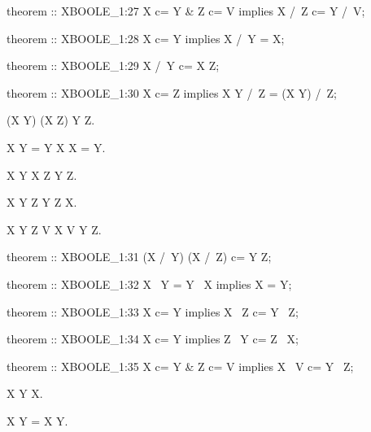 \begin{paracol}{2}
\begin{mizar}
theorem :: XBOOLE_1:27
  X c= Y & Z c= V implies 
  X /\ Z c= Y /\ V;

theorem :: XBOOLE_1:28
  X c= Y implies X /\ Y = X;

theorem :: XBOOLE_1:29
  X /\ Y c= X \/ Z;

theorem :: XBOOLE_1:30
  X c= Z implies 
  X \/ Y /\ Z = (X \/ Y) /\ Z;
\end{mizar}

\switchcolumn*\ensurevspace{5cm}

\begin{theorem}
  (X \cap Y) \cup (X \cap Z) \subset Y \cup Z.
\end{theorem}

\begin{theorem}
  X \setminus Y = Y \setminus X \implies X = Y.
\end{theorem}

\begin{theorem}
  X \subset Y \implies X \setminus Z \subset Y \setminus Z.
\end{theorem}

\begin{theorem}
  X \subset Y \implies Z \setminus Y \subset Z \setminus X.
\end{theorem}

\begin{theorem}
  X \subset Y \land Z \subset V \implies X \setminus V \subset Y \setminus Z.
\end{theorem}

\switchcolumn

\begin{mizar}
theorem :: XBOOLE_1:31
  (X /\ Y) \/ (X /\ Z) c= Y \/ Z;

theorem :: XBOOLE_1:32
  X \ Y = Y \ X implies X = Y;

theorem :: XBOOLE_1:33
  X c= Y implies X \ Z c= Y \ Z;

theorem :: XBOOLE_1:34
  X c= Y implies Z \ Y c= Z \ X;

theorem :: XBOOLE_1:35
  X c= Y & Z c= V 
  implies X \ V c= Y \ Z;
\end{mizar}

\switchcolumn*\ensurevspace{5cm}

\begin{theorem}
  X \setminus Y \subset X.
\end{theorem}

\begin{theorem}
  X \setminus Y = \emptyset \iff X \subset Y.
\end{theorem}


\end{paracol}
